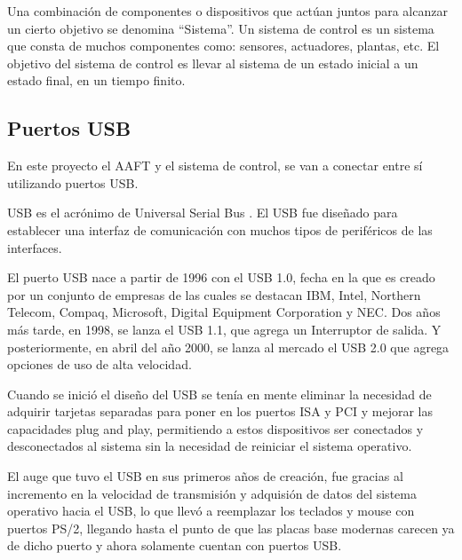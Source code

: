 \vspace{0.2cm}

Una combinación de componentes o dispositivos que actúan juntos
para alcanzar un cierto objetivo se denomina ``Sistema''. Un
sistema de control es un sistema que consta de muchos componentes
como: sensores, actuadores, plantas, etc. El objetivo del sistema
de control es llevar al sistema de un estado inicial a un estado
final, en un tiempo finito\cite{libroScontrol}.\\

\vspace{0.2cm}

\subsection{Puertos USB}
En este proyecto el AAFT y el sistema de control, se van a
conectar entre sí utilizando puertos USB.\\

\vspace{0.2cm}

USB es el acrónimo de Universal Serial Bus \cite{librodeUSB}. El
USB fue diseñado para establecer una interfaz de comunicación con
muchos
tipos de periféricos de las interfaces.\\

\vspace{0.2cm}

El puerto USB nace a partir de 1996 con el USB 1.0, fecha en la
que es creado por un conjunto de empresas de las cuales se
destacan IBM, Intel, Northern Telecom, Compaq, Microsoft, Digital
Equipment Corporation y NEC\cite{puertosES}. Dos años más tarde,
en 1998, se lanza el USB 1.1, que agrega un Interruptor de salida.
Y posteriormente, en abril del año 2000, se lanza al mercado el
USB
2.0 que agrega opciones de uso de alta velocidad.\cite{librodeUSB}\\

\vspace{0.2cm}

Cuando se inició el diseño del USB se tenía en mente eliminar la
necesidad de adquirir tarjetas separadas para poner en los puertos
ISA y PCI y mejorar las capacidades plug and play, permitiendo a
estos dispositivos ser conectados y desconectados al sistema sin
la necesidad de reiniciar el sistema operativo.\\

\vspace{0.2cm}

El auge que tuvo el USB en sus primeros años de creación, fue
gracias al incremento en la velocidad de transmisión y adquisión
de datos del sistema operativo hacia el USB, lo que llevó a
reemplazar los teclados y mouse con puertos PS/2, llegando hasta
el punto de que las placas base modernas carecen ya de dicho
puerto y ahora solamente cuentan con puertos USB.\\

